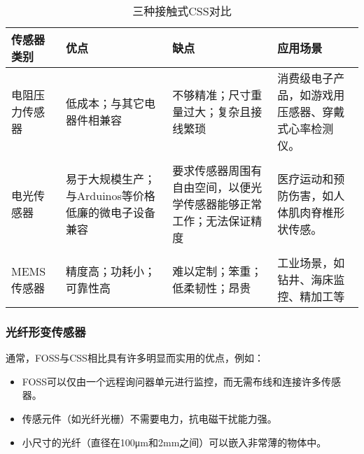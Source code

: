 \begin{table}[h]\footnotesize
\caption{三种接触式CSS对比}
\label{table:css}
\begin{center}
\begin{tabular}{p{}p{}p{}p{}}
\toprule
\textbf{传感器类别} & \textbf{优点} &\textbf{缺点} & \textbf{应用场景}\\

\midrule

电阻压力传感器 &
低成本；与其它电器件相兼容& 
不够精准；尺寸重量过大；复杂且接线繁琐&
消费级电子产品，如游戏用压感器、穿戴式心率检测仪。
\\
\\

电光传感器 &
易于大规模生产；与Arduinos等价格低廉的微电子设备兼容&
要求传感器周围有自由空间，以便光学传感器能够正常工作；无法保证精度 &
医疗运动和预防伤害，如人体肌肉脊椎形状传感。
\\
\\

MEMS传感器 & 
精度高；功耗小；可靠性高& 
难以定制；笨重；低柔韧性；昂贵&
工业场景，如钻井、海床监控、精加工等\\
\bottomrule
\end{tabular}
\end{center}
\end{table}

\FloatBarrier
\subsubsection{光纤形变传感器}
通常，FOSS与CSS相比具有许多明显而实用的优点，例如：
\begin{itemize}
\setlength{\topsep}{0pt}
\setlength{\itemsep}{0pt}
\setlength{\parsep}{0pt}
\setlength{\parskip}{0pt}
\item FOSS可以仅由一个远程询问器单元进行监控，而无需布线和连接许多传感器。
\item 传感元件（如光纤光栅）不需要电力，抗电磁干扰能力强。
\item 小尺寸的光纤（直径在100μm和2mm之间）可以嵌入非常薄的物体中。
\end{itemize}

